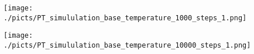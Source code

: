 \begin{frame}[plain]

	\begin{center}
		\begin{figure}\texttt{[image: ./picts/PT\_simululation\_base\_temperature\_1000\_steps\_1.png]}\end{figure}	
	\end{center}	
		
\end{frame}

\begin{frame}[plain]

	\begin{center}
		\begin{figure}\texttt{[image: ./picts/PT\_simululation\_base\_temperature\_10000\_steps\_1.png]}\end{figure}	
	\end{center}	
		
\end{frame}
